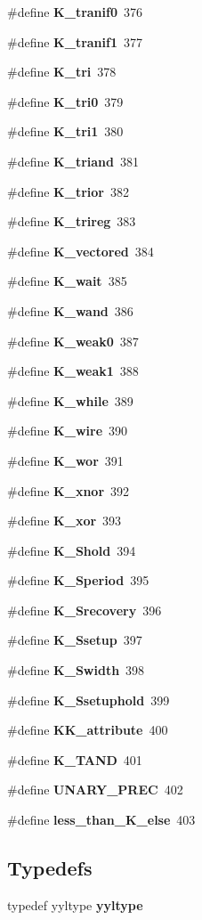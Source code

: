 \begin{CompactItemize}
\item 
\#define {\bf K\_\-tranif0}\ 376
\item 
\#define {\bf K\_\-tranif1}\ 377
\item 
\#define {\bf K\_\-tri}\ 378
\item 
\#define {\bf K\_\-tri0}\ 379
\item 
\#define {\bf K\_\-tri1}\ 380
\item 
\#define {\bf K\_\-triand}\ 381
\item 
\#define {\bf K\_\-trior}\ 382
\item 
\#define {\bf K\_\-trireg}\ 383
\item 
\#define {\bf K\_\-vectored}\ 384
\item 
\#define {\bf K\_\-wait}\ 385
\item 
\#define {\bf K\_\-wand}\ 386
\item 
\#define {\bf K\_\-weak0}\ 387
\item 
\#define {\bf K\_\-weak1}\ 388
\item 
\#define {\bf K\_\-while}\ 389
\item 
\#define {\bf K\_\-wire}\ 390
\item 
\#define {\bf K\_\-wor}\ 391
\item 
\#define {\bf K\_\-xnor}\ 392
\item 
\#define {\bf K\_\-xor}\ 393
\item 
\#define {\bf K\_\-Shold}\ 394
\item 
\#define {\bf K\_\-Speriod}\ 395
\item 
\#define {\bf K\_\-Srecovery}\ 396
\item 
\#define {\bf K\_\-Ssetup}\ 397
\item 
\#define {\bf K\_\-Swidth}\ 398
\item 
\#define {\bf K\_\-Ssetuphold}\ 399
\item 
\#define {\bf KK\_\-attribute}\ 400
\item 
\#define {\bf K\_\-TAND}\ 401
\item 
\#define {\bf UNARY\_\-PREC}\ 402
\item 
\#define {\bf less\_\-than\_\-K\_\-else}\ 403
\end{CompactItemize}
\subsection*{Typedefs}
\begin{CompactItemize}
\item 
typedef yyltype {\bf yyltype}
\end{CompactItemize}
